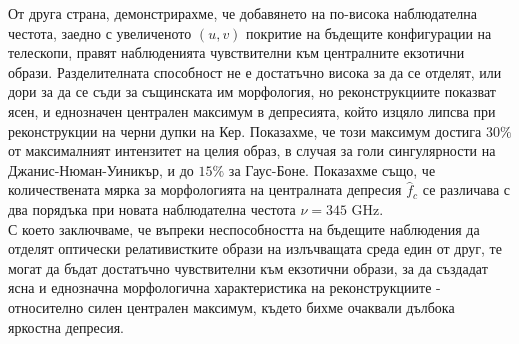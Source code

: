 От друга страна, демонстрирахме, че добавянето на по-висока наблюдателна честота, заедно с увеличеното $(u,v)$ покритие на бъдещите конфигурации на телескопи, правят наблюденията чувствителни към централните екзотични образи. Разделителната способност не е достатъчно висока за да се отделят, или дори за да се съди за същинската им морфология, но реконструкциите показват ясен, и еднозначен централен максимум в депресията, който изцяло липсва при реконструкции на черни дупки на Кер. Показахме, че този максимум достига $30\%$ от максималният интензитет на целия образ, в случая за голи сингулярности на Джанис-Нюман-Уиникър, и до $15\%$ за Гаус-Боне. Показахме също, че количествената мярка за морфологията на централната депресия $\hat{f}_c$ се различава с два порядъка при новата наблюдателна честота $\nu = 345$  GHz.\\

С което заключваме, че въпреки неспособността на бъдещите наблюдения да отделят оптически релативистките образи на излъчващата среда един от друг, те могат да бъдат достатъчно чувствителни към екзотични образи, за да създадат ясна и еднозначна морфологична характеристика на реконструкциите - относително силен централен максимум, където бихме очаквали дълбока яркостна депресия. 


